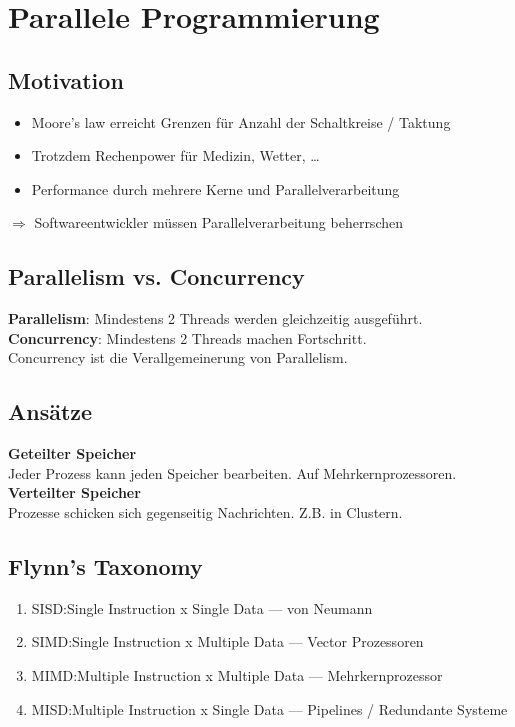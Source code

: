 

\section{Parallele Programmierung}

\subsection{Motivation}
\begin{itemize}
  \item Moore's law erreicht Grenzen für Anzahl der Schaltkreise / Taktung
  \item Trotzdem Rechenpower für Medizin, Wetter, \ldots
  \item Performance durch mehrere Kerne und Parallelverarbeitung
\end{itemize}
\(\Rightarrow\) Softwareentwickler müssen Parallelverarbeitung beherrschen

\subsection{Parallelism vs. Concurrency}
\textbf{Parallelism}: Mindestens 2 Threads werden gleichzeitig ausgeführt.\\
\textbf{Concurrency}: Mindestens 2 Threads machen Fortschritt.\\
Concurrency ist die Verallgemeinerung von Parallelism.

\subsection{Ansätze}
\textbf{Geteilter Speicher}\\
Jeder Prozess kann jeden Speicher bearbeiten. Auf Mehrkernprozessoren.\\
\textbf{Verteilter Speicher}\\
Prozesse schicken sich gegenseitig Nachrichten. Z.B. in Clustern.

\subsection{Flynn's Taxonomy}
\begin{enumerate}
  \item SISD:\@ Single Instruction x Single Data --- von Neumann
  \item SIMD:\@ Single Instruction x Multiple Data --- Vector Prozessoren
  \item MIMD:\@ Multiple Instruction x Multiple Data --- Mehrkernprozessor
  \item MISD:\@ Multiple Instruction x Single Data --- Pipelines / Redundante Systeme
\end{enumerate}

